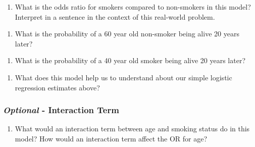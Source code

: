 \documentclass[]{article}
\providecommand{\tightlist}{%
  \setlength{\itemsep}{0pt}\setlength{\parskip}{0pt}}
\begin{document}
\begin{enumerate}
\def\labelenumi{\arabic{enumi}.}
\setcounter{enumi}{6}
\tightlist
\item
  What is the odds ratio for smokers compared to non-smokers in this
  model? Interpret in a sentence in the context of this real-world
  problem.
\end{enumerate}

\vspace{3in}

\begin{enumerate}
\def\labelenumi{\arabic{enumi}.}
\setcounter{enumi}{7}
\tightlist
\item
  What is the probability of a 60 year old non-smoker being alive 20
  years later?
\end{enumerate}

\vspace{3in}

\begin{enumerate}
\def\labelenumi{\arabic{enumi}.}
\setcounter{enumi}{8}
\tightlist
\item
  What is the probability of a 40 year old smoker being alive 20 years
  later?
\end{enumerate}

\vspace{3in}

\begin{enumerate}
\def\labelenumi{\arabic{enumi}.}
\setcounter{enumi}{9}
\tightlist
\item
  What does this model help us to understand about our simple logistic
  regression estimates above?
\end{enumerate}

\vspace{3in}

\hypertarget{optional---interaction-term}{%
\subsubsection{\texorpdfstring{\emph{Optional} - Interaction
Term}{Optional - Interaction Term}}\label{optional---interaction-term}}

\begin{enumerate}
\def\labelenumi{\arabic{enumi}.}
\setcounter{enumi}{10}
\tightlist
\item
  What would an interaction term between age and smoking status do in
  this model? How would an interaction term affect the OR for age?
\end{enumerate}
\end{document}
